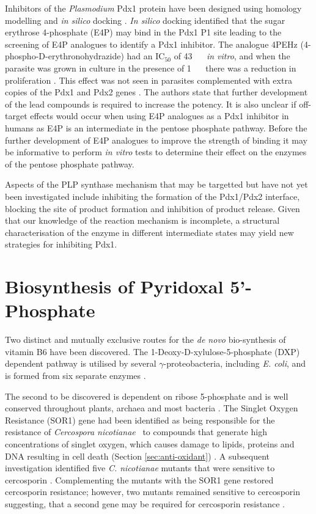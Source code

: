Inhibitors of the \textit{Plasmodium} Pdx1 protein have been designed using homology modelling and \textit{in silico} docking \cite{Reeksting2012}. \textit{In silico} docking identified that the sugar erythrose 4-phosphate (E4P) may bind in the Pdx1 P1 site leading to the screening of E4P analogues to identify a Pdx1 inhibitor. The analogue 4PEHz (4-phospho-D-erythronohydrazide) had an IC$_{50}$ of 43 \si{\micro\molar}~ \textit{in vitro}, and when the parasite was grown in culture in the presence of 1 \si{\micro\molar}~ there was a reduction in proliferation \cite{Reeksting2012}. This effect was not seen in parasites complemented with extra copies of the Pdx1 and Pdx2 genes \cite{Reeksting2012}. The authors state that further development of the lead compounds is required to increase the potency. It is also unclear if off-target effects would occur when using E4P analogues as a Pdx1 inhibitor in humans as E4P is an intermediate in the pentose phosphate pathway. Before the further development of E4P analogues to improve the strength of binding it may be informative to perform \textit{in vitro} tests to determine their effect on the enzymes of the pentose phosphate pathway.

Aspects of the PLP synthase mechanism that may be targetted but have not yet been investigated include inhibiting the formation of the Pdx1/Pdx2 interface, blocking the site of product formation and inhibition of product release. Given that our knowledge of the reaction mechanism is incomplete, a structural characterisation of the enzyme in different intermediate states may yield new strategies for inhibiting Pdx1.          

\newpage
\section{Biosynthesis of Pyridoxal 5'-Phosphate}
Two distinct and mutually exclusive routes for the \textit{de novo} bio-synthesis of vitamin B6 have been discovered. The 1-Deoxy-D-xylulose-5-phosphate (DXP) dependent pathway is utilised by several $\gamma$-proteobacteria, including \textit{E. coli}, and is formed from six separate enzymes \cite{Mittenhuber2001}. 

The second to be discovered is dependent on ribose 5-phosphate and is well conserved throughout plants, archaea and most bacteria \cite{Mittenhuber2001}. The Singlet Oxygen Resistance (SOR1) gene had been identified as being responsible for the resistance of \textit{Cercospora nicotianae}~ to compounds that generate high concentrations of singlet oxygen, which causes damage to lipids, proteins and DNA resulting in cell death (Section \ref{sec:anti-oxidant}) \cite{Ehrenshaft1998}. A subsequent investigation identified five \textit{C. nicotianae} mutants that were sensitive to cercosporin \cite{Ehrenshaft1999a}. Complementing the mutants with the SOR1 gene restored cercosporin resistance; however, two mutants remained sensitive to cercosporin suggesting, that a second gene may be required for cercosporin resistance \cite{Ehrenshaft1999a}. 

